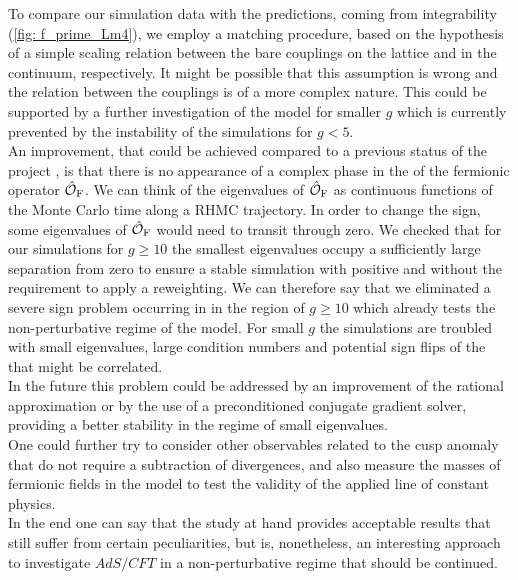 To compare our simulation data with the predictions, coming from integrability (\autoref{fig: f_prime_Lm4}), we employ a matching procedure, based on the hypothesis of a simple scaling relation between the bare couplings on the lattice and in the continuum, respectively. It might be possible that this assumption is wrong and the relation between the couplings is of a more complex nature. This could be supported by a further investigation of the model for smaller $g$ which is currently prevented by the instability of the simulations for $g <5$.\\
An improvement, that could be achieved compared to a previous status of the project \cite{Bianchi:2016cyv}, is that there is no appearance of a complex phase in the  of the fermionic operator $\hat{\mathcal{O}}_{\rm F}$. We can think of the eigenvalues of $\hat{\mathcal{O}}_{\rm F}$ as continuous functions of the Monte Carlo time along a RHMC trajectory. In order to change the  sign, some eigenvalues of $\hat{\mathcal{O}}_{\rm F}$ would need to transit through zero. We checked that for our simulations for $g \geq 10$ the smallest eigenvalues occupy a sufficiently large separation from zero to ensure  a stable simulation with positive  and without the requirement to apply a reweighting. We can therefore say that we eliminated a severe sign problem occurring  in \cite{Bianchi:2016cyv} in the region of $g\geq 10$ which already tests the non-perturbative regime of the model. For small $g$ the simulations are troubled with small eigenvalues, large condition numbers and potential sign flips of the  that might be correlated.\\
In the future this problem could be addressed by an improvement of the rational approximation or by the use of a preconditioned conjugate gradient solver, providing a better stability in the regime of small eigenvalues.\\
One could further try to consider other observables related to the cusp anomaly that do not require a subtraction of divergences, and also measure the masses of fermionic fields in the model to test the validity of the applied line of constant physics.\\
In the end one can say that the study at hand provides acceptable results that still suffer from certain peculiarities, but is, nonetheless, an interesting approach to investigate $AdS/CFT$ in a non-perturbative regime that should be continued.